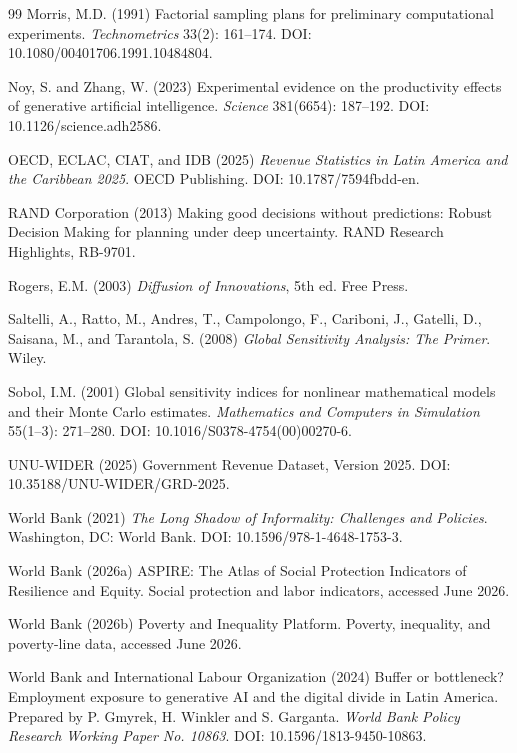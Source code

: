 \documentclass[11pt,a4paper]{article}
\begin{document}
\begin{thebibliography}{99}
Morris, M.D. (1991)
\newblock Factorial sampling plans for preliminary computational experiments.
\newblock \emph{Technometrics} 33(2): 161--174. DOI: 10.1080/00401706.1991.10484804.

Noy, S. and Zhang, W. (2023)
\newblock Experimental evidence on the productivity effects of generative artificial intelligence.
\newblock \emph{Science} 381(6654): 187--192. DOI: 10.1126/science.adh2586.

OECD, ECLAC, CIAT, and IDB (2025)
\newblock \emph{Revenue Statistics in Latin America and the Caribbean 2025}.
\newblock OECD Publishing. DOI: 10.1787/7594fbdd-en.

RAND Corporation (2013)
\newblock Making good decisions without predictions: Robust Decision Making for planning under deep uncertainty.
\newblock RAND Research Highlights, RB-9701.


Rogers, E.M. (2003)
\newblock \emph{Diffusion of Innovations}, 5th ed.
\newblock Free Press.



Saltelli, A., Ratto, M., Andres, T., Campolongo, F., Cariboni, J., Gatelli, D., Saisana, M., and Tarantola, S. (2008)
\newblock \emph{Global Sensitivity Analysis: The Primer}.
\newblock Wiley.

Sobol, I.M. (2001)
\newblock Global sensitivity indices for nonlinear mathematical models and their Monte Carlo estimates.
\newblock \emph{Mathematics and Computers in Simulation} 55(1--3): 271--280. DOI: 10.1016/S0378-4754(00)00270-6.

UNU-WIDER (2025)
\newblock Government Revenue Dataset, Version 2025.
\newblock DOI: 10.35188/UNU-WIDER/GRD-2025.

World Bank (2021)
\newblock \emph{The Long Shadow of Informality: Challenges and Policies}.
\newblock Washington, DC: World Bank. DOI: 10.1596/978-1-4648-1753-3.


World Bank (2026a)
\newblock ASPIRE: The Atlas of Social Protection Indicators of Resilience and Equity.
\newblock Social protection and labor indicators, accessed June 2026.

World Bank (2026b)
\newblock Poverty and Inequality Platform.
\newblock Poverty, inequality, and poverty-line data, accessed June 2026.

World Bank and International Labour Organization (2024)
\newblock Buffer or bottleneck? Employment exposure to generative AI and the digital divide in Latin America. Prepared by P. Gmyrek, H. Winkler and S. Garganta.
\newblock \emph{World Bank Policy Research Working Paper No. 10863}. DOI: 10.1596/1813-9450-10863.

\end{thebibliography}
\end{document}
